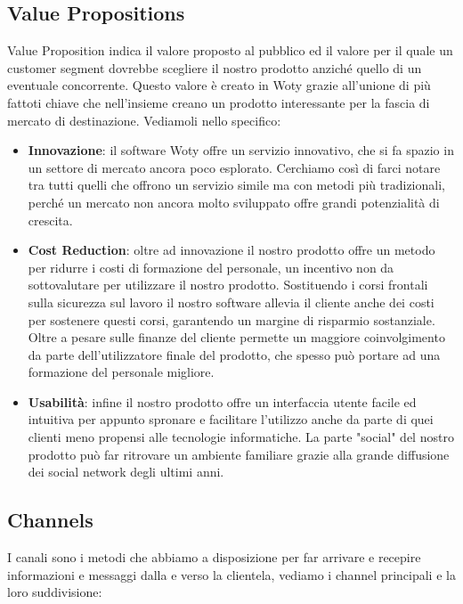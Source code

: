 \subsection{Value Propositions}
Value Proposition indica il valore proposto al pubblico ed il valore per il quale un customer segment dovrebbe scegliere il nostro prodotto anziché quello di un eventuale concorrente. Questo valore è creato in Woty grazie all'unione di più fattoti chiave che nell'insieme creano un prodotto interessante per la fascia di mercato di destinazione. Vediamoli nello specifico:

\begin{itemize}
\item \textbf{Innovazione}: il software Woty offre un servizio innovativo, che si fa spazio in un settore di mercato ancora poco esplorato. Cerchiamo così di farci notare tra tutti quelli che offrono un servizio simile ma con metodi più tradizionali, perché un mercato non ancora molto sviluppato offre grandi potenzialità di crescita.
\item \textbf{Cost Reduction}: oltre ad innovazione il nostro prodotto offre un metodo per ridurre i costi di formazione del personale, un incentivo non da sottovalutare per utilizzare il nostro prodotto. Sostituendo i corsi frontali sulla sicurezza sul lavoro il nostro software allevia il cliente anche dei costi per sostenere questi corsi, garantendo un margine di risparmio sostanziale. Oltre a pesare sulle finanze del cliente permette un maggiore coinvolgimento da parte dell'utilizzatore finale del prodotto, che spesso può portare ad una formazione del personale migliore.
\item \textbf{Usabilità}: infine il nostro prodotto offre un interfaccia utente facile ed intuitiva per appunto spronare e facilitare l'utilizzo anche da parte di quei clienti meno propensi alle tecnologie informatiche. La parte "social" del nostro prodotto può far ritrovare un ambiente familiare grazie alla grande diffusione dei social network degli ultimi anni.
\end{itemize}

\subsection{Channels}

I canali sono i metodi che abbiamo a disposizione per far arrivare e recepire informazioni e messaggi dalla e verso la clientela, vediamo i channel principali e la loro suddivisione:

